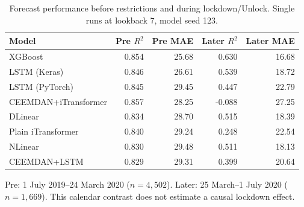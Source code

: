 \begin{table}[!htbp]
\centering
\caption{Forecast performance before restrictions and during lockdown/Unlock. Single runs at lookback 7, model seed 123.}\label{tab:periodperformance}
\setlength{\tabcolsep}{4pt}
\begin{tabular}{lrrrr}
\toprule
Model & Pre $R^2$ & Pre MAE & Later $R^2$ & Later MAE \\
\midrule
XGBoost & 0.854 & 25.68 & 0.630 & 16.68 \\
LSTM (Keras) & 0.846 & 26.61 & 0.539 & 18.72 \\
LSTM (PyTorch) & 0.845 & 29.45 & 0.447 & 22.79 \\
CEEMDAN+iTransformer & 0.857 & 28.25 & -0.088 & 27.25 \\
DLinear & 0.834 & 28.70 & 0.515 & 18.39 \\
Plain iTransformer & 0.840 & 29.24 & 0.248 & 22.54 \\
NLinear & 0.830 & 29.48 & 0.511 & 18.13 \\
CEEMDAN+LSTM & 0.829 & 29.31 & 0.399 & 20.64 \\
\bottomrule
\end{tabular}
\par\smallskip\begin{minipage}{0.98\linewidth}\footnotesize Pre: 1 July 2019--24 March 2020 ($n=4,502$). Later: 25 March--1 July 2020 ($n=1,669$). This calendar contrast does not estimate a causal lockdown effect.\end{minipage}
\end{table}

